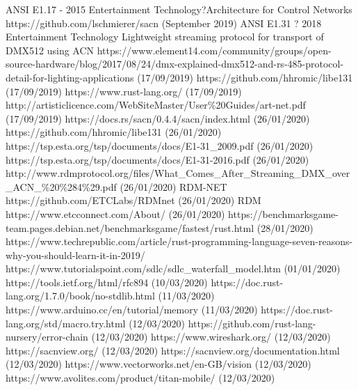 \documentclass[11pt,a4paper]{report}
\begin{document}
	\begin{thebibliography}{9}
		ANSI E1.17 - 2015 Entertainment Technology?Architecture for Control Networks
		https://github.com/lschmierer/sacn (September 2019)
		ANSI E1.31 ? 2018 Entertainment Technology Lightweight streaming protocol for transport of DMX512 using ACN
		https://www.element14.com/community/groups/open-source-hardware/blog/2017/08/24/dmx-explained-dmx512-and-rs-485-protocol-detail-for-lighting-applications (17/09/2019)
		https://github.com/hhromic/libe131 (17/09/2019)
		https://www.rust-lang.org/ (17/09/2019)
		http://artisticlicence.com/WebSiteMaster/User\%20Guides/art-net.pdf (17/09/2019)
		https://docs.rs/sacn/0.4.4/sacn/index.html
		(26/01/2020)
		https://github.com/hhromic/libe131
		(26/01/2020)
		https://tsp.esta.org/tsp/documents/docs/E1-31\_2009.pdf
		(26/01/2020)
		https://tsp.esta.org/tsp/documents/docs/E1-31-2016.pdf
		(26/01/2020)
		http://www.rdmprotocol.org/files/What\_Comes\_After\_Streaming\_DMX\_over\_ACN\_\%20\%284\%29.pdf (26/01/2020)
		RDM-NET
		https://github.com/ETCLabs/RDMnet (26/01/2020)
		RDM
		https://www.etcconnect.com/About/ (26/01/2020)
		https://benchmarksgame-team.pages.debian.net/benchmarksgame/fastest/rust.html (28/01/2020)
		https://www.techrepublic.com/article/rust-programming-language-seven-reasons-why-you-should-learn-it-in-2019/
		https://www.tutorialspoint.com/sdlc/sdlc\_waterfall\_model.htm (01/01/2020)
		https://tools.ietf.org/html/rfc894 (10/03/2020)
		https://doc.rust-lang.org/1.7.0/book/no-stdlib.html (11/03/2020)
		https://www.arduino.cc/en/tutorial/memory (11/03/2020)
		https://doc.rust-lang.org/std/macro.try.html (12/03/2020)
		https://github.com/rust-lang-nursery/error-chain (12/03/2020)
		https://www.wireshark.org/ (12/03/2020)		
		https://sacnview.org/ (12/03/2020)
		https://sacnview.org/documentation.html (12/03/2020)
		https://www.vectorworks.net/en-GB/vision (12/03/2020)
		https://www.avolites.com/product/titan-mobile/ (12/03/2020)
		
	\end{thebibliography}
	
\end{document}
